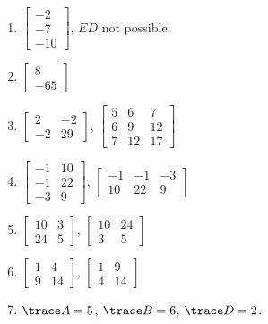 \begin{multicols}{2}
\begin{enumerate}
\begin{enumerate}
	\item 
	$
\begin{bmatrix}
 -2 \\
 -7 \\
 -10
\end{bmatrix}
$, $ED$ not possible
	\item $
\begin{bmatrix}
 8 \\
 -65
\end{bmatrix}
$
	\item 
$\begin{bmatrix}
 2 & -2 \\
 -2 & 29
\end{bmatrix}$, 
$
\begin{bmatrix}
 5 & 6 & 7 \\
 6 & 9 & 12 \\
 7 & 12 & 17
\end{bmatrix}
$
	\item 
$\begin{bmatrix}
 -1 & 10 \\
 -1 & 22 \\
 -3 & 9
\end{bmatrix}
$, $
\begin{bmatrix}
 -1 & -1 & -3 \\
 10 & 22 & 9
\end{bmatrix}
$	\item 
$\begin{bmatrix}
 10 & 3 \\
 24 & 5
\end{bmatrix}
$, $
\begin{bmatrix}
 10 & 24 \\
 3 & 5
\end{bmatrix}
$	
\item 
$\begin{bmatrix}
 1 & 4 \\
 9 & 14
\end{bmatrix}
$, $
\begin{bmatrix}
 1 & 9 \\
 4 & 14
\end{bmatrix}
$	\item  $\trace A=5$, $\trace B=6$, $\trace D=2$.	
\end{enumerate}








\end{enumerate}
\end{multicols}
